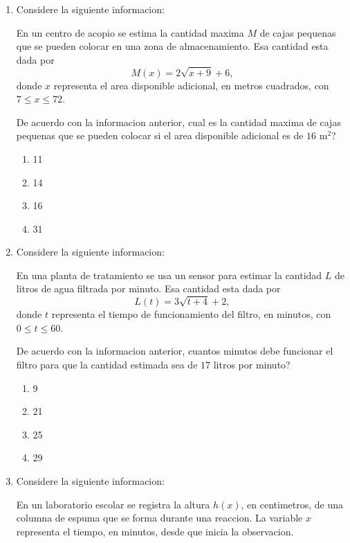 \documentclass[12pt]{article}
\begin{document}
\begin{enumerate}[label=\textbf{\arabic*.}, itemsep=1.05cm]

\Needspace{0.58\textheight}
\item
Considere la siguiente informacion:

En un centro de acopio se estima la cantidad maxima $M$ de cajas pequenas que se pueden colocar en una zona de almacenamiento. Esa cantidad esta dada por
\[
M(x)=2\sqrt{x+9}+6,
\]
donde $x$ representa el area disponible adicional, en metros cuadrados, con $7 \leq x \leq 72$.

De acuerdo con la informacion anterior, \textquestiondown cual es la cantidad maxima de cajas pequenas que se pueden colocar si el area disponible adicional es de $16\text{ m}^2$?

\begin{enumerate}[label=\Alph*)]
  \item 11
  \item 14
  \item 16
  \item 31
\end{enumerate}

\Needspace{0.60\textheight}
\item
Considere la siguiente informacion:

En una planta de tratamiento se usa un sensor para estimar la cantidad $L$ de litros de agua filtrada por minuto. Esa cantidad esta dada por
\[
L(t)=3\sqrt{t+4}+2,
\]
donde $t$ representa el tiempo de funcionamiento del filtro, en minutos, con $0 \leq t \leq 60$.

De acuerdo con la informacion anterior, \textquestiondown cuantos minutos debe funcionar el filtro para que la cantidad estimada sea de $17$ litros por minuto?

\begin{enumerate}[label=\Alph*)]
  \item 9
  \item 21
  \item 25
  \item 29
\end{enumerate}

\Needspace{0.96\textheight}
\item
Considere la siguiente informacion:

En un laboratorio escolar se registra la altura $h(x)$, en centimetros, de una columna de espuma que se forma durante una reaccion. La variable $x$ representa el tiempo, en minutos, desde que inicia la observacion.


\end{enumerate}
\end{document}
